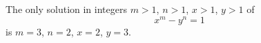 \begin{conjecture}
    The only solution in integers $m>1$, $n>1$, $x>1$, $y>1$ of
\[
    x^m-y^n=1
\]
    is $m=3$, $n=2$, $x=2$, $y=3$.
\end{conjecture}
